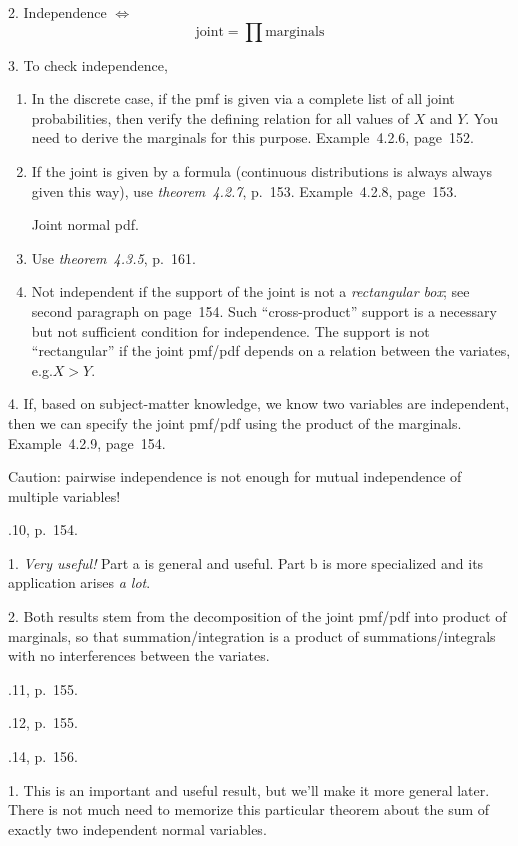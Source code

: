 \documentclass[12pt]{article}
\begin{document}
2. Independence $\Leftrightarrow$
\[
\text{joint} = \prod \text{marginals}
\]

3. To check independence,
\begin{enumerate}
\item
In the discrete case, if the pmf is given via a complete list of all
joint probabilities, then verify the defining relation for all values of
$X$ and $Y$. You need to derive the marginals for this purpose.
Example~4.2.6, page~152.
\item
If the joint is given by a formula (continuous distributions is always
always given this way), use  \emph{theorem~4.2.7}, p.~153.
Example~4.2.8, page~153.

\example Joint normal pdf.

\item Use \emph{theorem~4.3.5}, p.~161.

\item
Not independent if the support of the joint is not a \emph{rectangular box};
see second paragraph on page~154.
Such ``cross-product'' support is a necessary but not sufficient
condition for independence.
The support is not ``rectangular'' if the joint pmf/pdf
depends on a relation between the variates, e.g.\@ $X > Y$.
\end{enumerate}

4. If, based on subject-matter knowledge, we know two variables are
independent, then we can specify the joint pmf/pdf using the product of
the marginals. Example~4.2.9, page~154.

Caution: pairwise independence is not enough for mutual independence of
multiple variables!

.10, p.~154.

\alert
1. \emph{Very useful!}
Part a is general and useful.
Part b is more specialized and its application arises \emph{a lot}.

2.
Both results stem from the decomposition of the joint pmf/pdf
into product of marginals, so that summation/integration
is a product of summations/integrals with no interferences between the
variates.

.11, p.~155.

.12, p.~155.

.14, p.~156.

\alert
1. This is an important and useful result,
but we'll make it more general later.
There is not much need to memorize this particular theorem
about the sum of exactly two independent normal variables.
\end{document}
